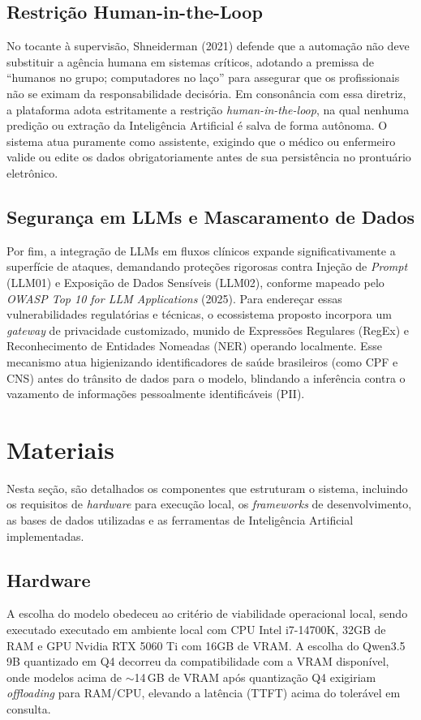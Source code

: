 \documentclass[12pt]{article}
\begin{document}
\subsection{Restrição Human-in-the-Loop}
No tocante à supervisão, Shneiderman (2021) defende que a automação não deve substituir a agência humana em sistemas críticos, adotando a premissa de ``humanos no grupo; computadores no laço'' para assegurar que os profissionais não se eximam da responsabilidade decisória. Em consonância com essa diretriz, a plataforma adota estritamente a restrição \textit{human-in-the-loop}, na qual nenhuma predição ou extração da Inteligência Artificial é salva de forma autônoma. O sistema atua puramente como assistente, exigindo que o médico ou enfermeiro valide ou edite os dados obrigatoriamente antes de sua persistência no prontuário eletrônico.

\subsection{Segurança em LLMs e Mascaramento de Dados}
Por fim, a integração de LLMs em fluxos clínicos expande significativamente a superfície de ataques, demandando proteções rigorosas contra Injeção de \textit{Prompt} (LLM01) e Exposição de Dados Sensíveis (LLM02), conforme mapeado pelo \textit{OWASP Top 10 for LLM Applications} (2025). Para endereçar essas vulnerabilidades regulatórias e técnicas, o ecossistema proposto incorpora um \textit{gateway} de privacidade customizado, munido de Expressões Regulares (RegEx) e Reconhecimento de Entidades Nomeadas (NER) operando localmente. Esse mecanismo atua higienizando identificadores de saúde brasileiros (como CPF e CNS) antes do trânsito de dados para o modelo, blindando a inferência contra o vazamento de informações pessoalmente identificáveis (PII).

\section{Materiais}

Nesta seção, são detalhados os componentes que estruturam o sistema, incluindo os requisitos de \textit{hardware} para execução local, os \textit{frameworks} de desenvolvimento, as bases de dados utilizadas e as ferramentas de Inteligência Artificial implementadas.

\subsection{Hardware}
A escolha do modelo obedeceu ao critério de viabilidade operacional local, sendo executado executado em ambiente local com CPU Intel i7-14700K, 32GB de RAM e GPU Nvidia RTX 5060 Ti com 16GB de VRAM.
A escolha do Qwen3.5 9B quantizado em Q4 decorreu da compatibilidade com a VRAM disponível, onde modelos acima de $\sim$14\,GB de VRAM após quantização Q4 exigiriam \textit{offloading} para RAM/CPU, elevando a latência (TTFT) acima do tolerável em consulta.
\end{document}
